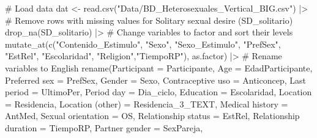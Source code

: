 \documentclass[
  bookmarksnumbered]{article}
\newenvironment{Shaded}{\begin{snugshade}}{\end{snugshade}}
\newcommand{\AttributeTok}[1]{\textcolor[rgb]{0.80,0.80,0.80}{#1}}
\newcommand{\CommentTok}[1]{\textcolor[rgb]{0.50,0.62,0.50}{#1}}
\newcommand{\FunctionTok}[1]{\textcolor[rgb]{0.94,0.94,0.56}{#1}}
\newcommand{\NormalTok}[1]{\textcolor[rgb]{0.80,0.80,0.80}{#1}}
\newcommand{\OtherTok}[1]{\textcolor[rgb]{0.94,0.94,0.56}{#1}}
\newcommand{\SpecialCharTok}[1]{\textcolor[rgb]{0.86,0.64,0.64}{#1}}
\newcommand{\StringTok}[1]{\textcolor[rgb]{0.80,0.58,0.58}{#1}}
\begin{document}
\begin{Shaded}
\begin{Highlighting}[]
\CommentTok{\# Load data}
\NormalTok{dat }\OtherTok{\textless{}{-}} \FunctionTok{read.csv}\NormalTok{(}\StringTok{"Data/BD\_Heterosexuales\_Vertical\_BIG.csv"}\NormalTok{) }\SpecialCharTok{|\textgreater{}}
  \CommentTok{\# Remove rows with missing values for Solitary sexual desire (SD\_solitario)}
  \FunctionTok{drop\_na}\NormalTok{(SD\_solitario) }\SpecialCharTok{|\textgreater{}} 
  \CommentTok{\# Change variables to factor and sort their levels}
  \FunctionTok{mutate\_at}\NormalTok{(}\FunctionTok{c}\NormalTok{(}\StringTok{"Contenido\_Estimulo"}\NormalTok{, }\StringTok{"Sexo"}\NormalTok{, }\StringTok{"Sexo\_Estimulo"}\NormalTok{, }\StringTok{"PrefSex"}\NormalTok{, }\StringTok{"EstRel"}\NormalTok{, }\StringTok{"Escolaridad"}\NormalTok{,}
              \StringTok{"Religion"}\NormalTok{,}\StringTok{"TiempoRP"}\NormalTok{), as.factor) }\SpecialCharTok{|\textgreater{}} 
  \CommentTok{\# Rename variables to English}
  \FunctionTok{rename}\NormalTok{(}\AttributeTok{Participant =}\NormalTok{ Participante, }
         \AttributeTok{Age =}\NormalTok{ EdadParticipante, }
         \StringTok{\textasciigrave{}}\AttributeTok{Preferred sex}\StringTok{\textasciigrave{}} \OtherTok{=}\NormalTok{ PrefSex,}
         \AttributeTok{Gender =}\NormalTok{ Sexo, }
         \StringTok{\textasciigrave{}}\AttributeTok{Contraceptive uso}\StringTok{\textasciigrave{}} \OtherTok{=}\NormalTok{ Anticoncep, }
         \StringTok{\textasciigrave{}}\AttributeTok{Last period}\StringTok{\textasciigrave{}} \OtherTok{=}\NormalTok{ UltimoPer,}
         \StringTok{\textasciigrave{}}\AttributeTok{Period day}\StringTok{\textasciigrave{}} \OtherTok{=}\NormalTok{ Dia\_ciclo, }
         \AttributeTok{Education =}\NormalTok{ Escolaridad, }
         \AttributeTok{Location =}\NormalTok{ Residencia,}
         \StringTok{\textasciigrave{}}\AttributeTok{Location (other)}\StringTok{\textasciigrave{}} \OtherTok{=}\NormalTok{ Residencia\_3\_TEXT, }
         \StringTok{\textasciigrave{}}\AttributeTok{Medical history}\StringTok{\textasciigrave{}} \OtherTok{=}\NormalTok{ AntMed,}
         \StringTok{\textasciigrave{}}\AttributeTok{Sexual orientation}\StringTok{\textasciigrave{}} \OtherTok{=}\NormalTok{ OS, }
         \StringTok{\textasciigrave{}}\AttributeTok{Relationship status}\StringTok{\textasciigrave{}} \OtherTok{=}\NormalTok{ EstRel,}
         \StringTok{\textasciigrave{}}\AttributeTok{Relationship duration}\StringTok{\textasciigrave{}} \OtherTok{=}\NormalTok{ TiempoRP, }
         \StringTok{\textasciigrave{}}\AttributeTok{Partner gender}\StringTok{\textasciigrave{}} \OtherTok{=}\NormalTok{ SexPareja,}

\end{Highlighting}
\end{Shaded}
\end{document}
